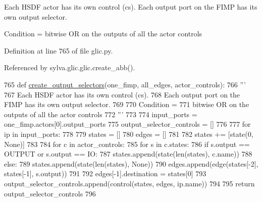 \begin{DoxyVerb}  Each HSDF actor has its own control (cs).
  Each output port on the FIMP has its own output selector.

  Condition =
    bitwise OR on the outputs of all the actor controls
\end{DoxyVerb}
 

Definition at line 765 of file glic.\+py.



Referenced by sylva.\+glic.\+glic.\+create\+\_\+abb().


\begin{DoxyCode}
765   \textcolor{keyword}{def }\hyperlink{namespacesylva_1_1glic_1_1glic_a7eb9347832747ffffb52851a1ee2d08f}{create\_output\_selectors}(one\_fimp, all\_edges, actor\_controls):
766     \textcolor{stringliteral}{'''}
767 \textcolor{stringliteral}{      Each HSDF actor has its own control (cs).}
768 \textcolor{stringliteral}{      Each output port on the FIMP has its own output selector.}
769 \textcolor{stringliteral}{}
770 \textcolor{stringliteral}{      Condition =}
771 \textcolor{stringliteral}{        bitwise OR on the outputs of all the actor controls}
772 \textcolor{stringliteral}{    '''}
773 
774     input\_ports = one\_fimp.actors[0].output\_ports
775     output\_selector\_controls = []
776 
777     \textcolor{keywordflow}{for} ip \textcolor{keywordflow}{in} input\_ports:
778 
779       states = []
780       edges = []
781 
782       states += [state(0, \textcolor{keywordtype}{None})]
783 
784       \textcolor{keywordflow}{for} c \textcolor{keywordflow}{in} actor\_controls:
785         \textcolor{keywordflow}{for} s \textcolor{keywordflow}{in} c.states:
786           \textcolor{keywordflow}{if} s.output == OUTPUT \textcolor{keywordflow}{or} s.output == IO:
787             states.append(state(len(states), c.name))
788           \textcolor{keywordflow}{else}:
789             states.append(state(len(states), \textcolor{keywordtype}{None}))
790           edges.append(edge(states[-2], states[-1], s.output))
791 
792       edges[-1].destination = states[0]
793       output\_selector\_controls.append(control(states, edges, ip.name))
794 
795     \textcolor{keywordflow}{return} output\_selector\_controls
796 
\end{DoxyCode}
\mbox{\label{namespacesylva_1_1glic_1_1glic_a113a86d012f0236519ec7ac19e0e4850}} 
